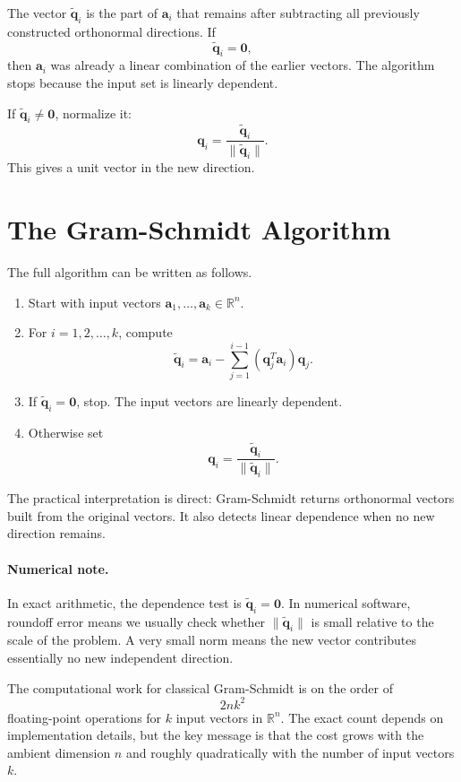 The vector \(\widetilde{\mathbf{q}}_i\) is the part of \(\mathbf{a}_i\) that remains after subtracting all previously constructed orthonormal directions. If
\[
    \widetilde{\mathbf{q}}_i=\mathbf{0},
\]
then \(\mathbf{a}_i\) was already a linear combination of the earlier vectors. The algorithm stops because the input set is linearly dependent.

If \(\widetilde{\mathbf{q}}_i\neq\mathbf{0}\), normalize it:
\[
    \mathbf{q}_i=\frac{\widetilde{\mathbf{q}}_i}{\|\widetilde{\mathbf{q}}_i\|}.
\]
This gives a unit vector in the new direction.

\section{The Gram-Schmidt Algorithm}
\label{mf:classical-gram-schmidt-algorithm}

The full algorithm can be written as follows.

\begin{enumerate}
    \item Start with input vectors \(\mathbf{a}_1,\ldots,\mathbf{a}_k\in\mathbb{R}^n\).
    \item For \(i=1,2,\ldots,k\), compute
    \[
        \widetilde{\mathbf{q}}_i
        =
        \mathbf{a}_i
        -
        \sum_{j=1}^{i-1}(\mathbf{q}_j^T\mathbf{a}_i)\mathbf{q}_j.
    \]
    \item If \(\widetilde{\mathbf{q}}_i=\mathbf{0}\), stop. The input vectors are linearly dependent.
    \item Otherwise set
    \[
        \mathbf{q}_i=\frac{\widetilde{\mathbf{q}}_i}{\|\widetilde{\mathbf{q}}_i\|}.
    \]
\end{enumerate}

The practical interpretation is direct: Gram-Schmidt returns orthonormal vectors built from the original vectors. It also detects linear dependence when no new direction remains.

\paragraph{Numerical note.}
In exact arithmetic, the dependence test is \(\widetilde{\mathbf{q}}_i=\mathbf{0}\). In numerical software, roundoff error means we usually check whether \(\|\widetilde{\mathbf{q}}_i\|\) is small relative to the scale of the problem. A very small norm means the new vector contributes essentially no new independent direction.

The computational work for classical Gram-Schmidt is on the order of
\[
    2nk^2
\]
floating-point operations for \(k\) input vectors in \(\mathbb{R}^n\). The exact count depends on implementation details, but the key message is that the cost grows with the ambient dimension \(n\) and roughly quadratically with the number of input vectors \(k\).

